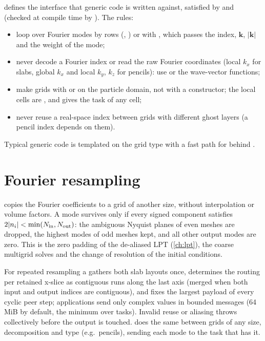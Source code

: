  defines the interface that generic code is written against, satisfied by  and
 (checked at compile time by ). The rules:
\begin{itemize}
\item loop over Fourier modes by rows (, ) or with
      , which passes the index, $\bm k$, $|\bm k|$ and the weight of the mode;
\item never decode a Fourier index or read the raw Fourier coordinates (local $k_x$ for slabs, global $k_x$ and local $k_y$,
      $k_z$ for pencils): use  or the wave-vector functions;
\item make grids with  or  on the particle domain,
      not with a constructor; the local cells are , and  gives the task of any cell;
\item never reuse a real-space index between grids with different ghost layers (a pencil index depends on them).
\end{itemize}
Typical generic code is templated on the grid type with a fast path for  behind .

\section{Fourier resampling}\label{sec:grids-resampling}

 copies the Fourier coefficients to a grid of another size, without interpolation or
volume factors. A mode survives only if every signed component satisfies $2|n_i|<\min(N_{\rm in},N_{\rm out})$: the ambiguous
Nyquist planes of even meshes are dropped, the highest modes of odd meshes kept, and all other output modes are zero. This is
the zero padding of the de-aliased LPT (\cref{ch:lpt}), the coarse multigrid solves and the change of resolution of the
initial conditions.

For repeated resampling a  gathers both slab layouts once, determines the routing per retained
x-slice as contiguous runs along the last axis (merged when both input and output indices are contiguous), and fixes the
largest payload of every cyclic peer step; applications send only complex values in bounded  messages
(64\,MiB by default, the minimum over tasks). Invalid reuse or aliasing throws collectively before the output is touched.
 does the same between grids of any size, decomposition and type (e.g.\ pencils), sending each mode to
the task that has it.

